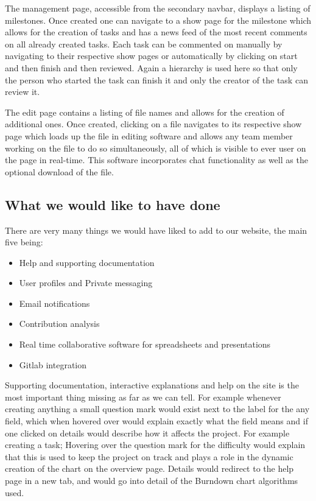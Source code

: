 \documentclass[a4wide, 11pt]{article}
\begin{document}
The management page, accessible from the secondary navbar, displays a listing of milestones. Once created one can navigate to a show page for the milestone which allows for the creation of tasks and has a news feed of the most recent comments on all already created tasks. Each task can be commented on manually by navigating to their respective show pages or automatically by clicking on start and then finish and then reviewed. Again a hierarchy is used here so that only the person who started the task can finish it and only the creator of the task can review it.

The edit page contains a listing of file names and allows for the creation of additional ones. Once created, clicking on a file navigates to its respective show page which loads up the file in editing software and allows any team member working on the file to do so simultaneously, all of which is visible to ever user on the page in real-time. This software incorporates chat functionality as well as the optional download of the file. 

\subsection{What we would like to have done}
There are very many things we would have liked to add to our website, the main five being:
\begin{itemize}
  \item Help and supporting documentation
  \item User profiles and Private messaging
  \item Email notifications
  \item Contribution analysis
  \item Real time collaborative software for spreadsheets and presentations
  \item Gitlab integration
\end{itemize}

Supporting documentation, interactive explanations and help on the site is the most important thing missing as far as we can tell. For example whenever creating anything a small question mark would exist next to the label for the any field, which when hovered over would explain exactly what the field means and if one clicked on details would describe how it affects the project. For example creating a task; Hovering over the question mark for the difficulty would explain that this is used to keep the project on track and plays a role in the dynamic creation of the chart on the overview page. Details would redirect to the help page in a new tab, and would go into detail of the Burndown chart algorithms used.
\end{document}
